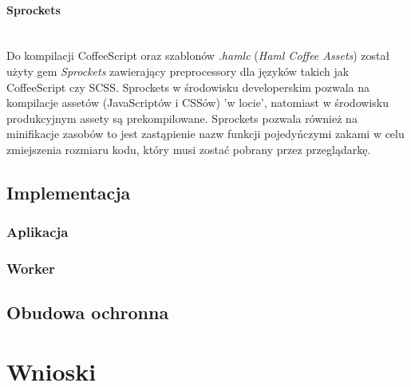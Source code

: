 \documentclass[11pt,a4paper, twoside]{article}
\begin{document}
\paragraph{Sprockets} ~\\
\newline
Do kompilacji CoffeeScript oraz szablonów \emph{.hamlc} (\emph{Haml Coffee Assets}) został użyty gem \emph{Sprockets} zawierający preprocessory dla języków takich jak CoffeeScript czy SCSS. Sprockets w środowisku developerskim pozwala na kompilacje assetów (JavaScriptów i CSSów) 'w locie', natomiast w środowisku produkcyjnym assety są prekompilowane. Sprockets pozwala również na minifikacje zasobów to jest zastąpienie nazw funkcji pojedyńczymi zakami w celu zmiejszenia rozmiaru kodu, który musi zostać pobrany przez przeglądarkę. 
\subsection{Implementacja}
\subsubsection{Aplikacja}
\subsubsection{Worker}
\subsection{Obudowa ochronna}
\section{Wnioski}
\end{document}
